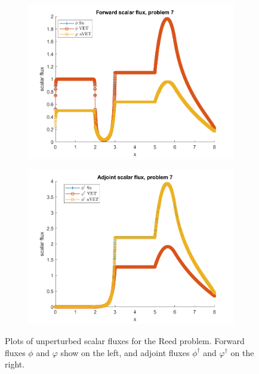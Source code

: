 \documentclass[12pt]{report}
\begin{document}
\begin{figure}[H]
\centering
\begin{subfigure}{.5\textwidth}
  \centering
  \includegraphics[width=.98\linewidth]{figures2/7phi.png}
\end{subfigure}%
\begin{subfigure}{.5\textwidth}
  \centering
  \includegraphics[width=.98\linewidth]{figures2/7phia.png}
\end{subfigure}
\caption{Plots of unperturbed scalar fluxes for the Reed problem. Forward fluxes $\phi$ and $\varphi$ show on the left, and adjoint fluxes $\phi^\dag$ and $\varphi^\dag$ on the right.}
\label{Flux4}
\end{figure}
\end{document}

